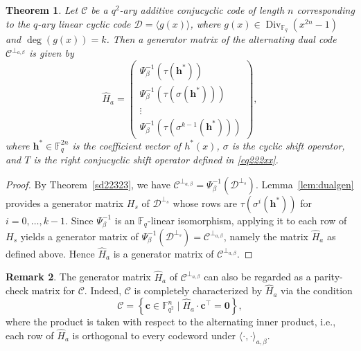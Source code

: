 \documentclass{aims}
\numberwithin{equation}{section}
\newtheorem{theorem}{Theorem}[section]
\theoremstyle{definition}
\newtheorem{remark}[theorem]{Remark}
\newcommand{\F}{\mathbb{F}}
\newcommand{\Div}{\operatorname{Div}}
\begin{document}
\begin{theorem}\label{thm:parity}
	Let $\mathcal{C}$ be a $q^2$-ary additive conjucyclic code of length $n$ corresponding to the $q$-ary linear cyclic code $\mathcal{D} = \langle g(x) \rangle$, where $g(x) \in \Div_{\F_q}(x^{2n}-1)$ and $\deg(g(x)) = k$. Then a generator matrix of the alternating dual code $\mathcal{C}^{\perp_{a,\beta}}$ is given by
	\begin{equation}\label{rere11}
		\hat{H}_a = \begin{pmatrix}
		\Psi_\beta^{-1}(\tau(\pmb{h^*})) \\
		\Psi_\beta^{-1}(\tau(\sigma(\pmb{h^*}))) \\
		\vdots \\
		\Psi_\beta^{-1}(\tau(\sigma^{k-1}(\pmb{h^*})))
	\end{pmatrix},
	\end{equation}
	where $\pmb{h^*} \in \F_q^{2n}$ is the coefficient vector of $h^*(x)$, $\sigma$ is the cyclic shift operator, and $T$ is the right conjucyclic shift operator defined in \eqref{eq222xx}.
\end{theorem}
\begin{proof}
	By Theorem~\ref{sd22323}, we have $\mathcal{C}^{\perp_{a,\beta}} = \Psi_\beta^{-1}(\mathcal{D}^{\perp_s})$. 
	Lemma~\ref{lem:dualgen} provides a generator matrix $H_s$ of $\mathcal{D}^{\perp_s}$ whose rows are $\tau(\sigma^i(\pmb{h^*}))$ for $i=0,\dots,k-1$. 
	Since $\Psi_\beta^{-1}$ is an $\F_q$-linear isomorphism, applying it to each row of $H_s$ yields a generator matrix of $\Psi_\beta^{-1}(\mathcal{D}^{\perp_s}) = \mathcal{C}^{\perp_{a,\beta}}$, namely the matrix $\hat{H}_a$ as defined above. Hence $\hat{H}_a$ is a generator matrix of $\mathcal{C}^{\perp_{a,\beta}}$.
\end{proof}

\begin{remark}
	The generator matrix $\hat{H}_a$ of $\mathcal{C}^{\perp_{a,\beta}}$ can also be regarded as a parity-check matrix for $\mathcal{C}$. Indeed, $\mathcal{C}$ is completely characterized by $\hat{H}_a$ via the condition
	\[
	\mathcal{C} = \left\{ \mathbf{c} \in \F_{q^2}^n \mid \hat{H}_a \cdot \mathbf{c}^\top = \mathbf{0} \right\},
	\]
	where the product is taken with respect to the alternating inner product, i.e., each row of $\hat{H}_a$ is orthogonal to every codeword under $\langle \cdot, \cdot \rangle_{a,\beta}$.
\end{remark}
\end{document}
